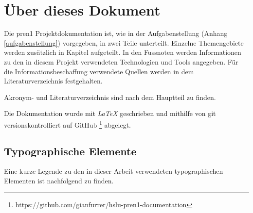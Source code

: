 \documentclass[../main.tex]{subfiles}
\begin{document}
  
  \section*{Über dieses Dokument}

  Die \acrshort{pren1} Projektdokumentation ist, wie in der Aufgabenstellung (Anhang \ref{aufgabenstellung}) vorgegeben, in zwei Teile unterteilt.
  Einzelne Themengebiete werden zusätzlich in Kapitel aufgeteilt.
  In den Fussnoten werden Informationen zu den in diesem Projekt verwendeten
  Technologien und Tools angegeben.
  Für die Informationsbeschaffung verwendete Quellen werden in dem Literaturverzeichnis festgehalten.

  Akronym- und Literaturverzeichnis sind nach dem Hauptteil zu finden.

  Die Dokumentation wurde mit {\it LaTeX} geschrieben und mithilfe von git
  versionskontrolliert auf GitHub \footnote{https://github.com/gianfurrer/hslu-pren1-documentation}
  abgelegt.
  
  \subsection*{Typographische Elemente}

  Eine kurze Legende zu den in dieser Arbeit verwendeten typographischen Elementen
  ist nachfolgend zu finden.

\end{document}
